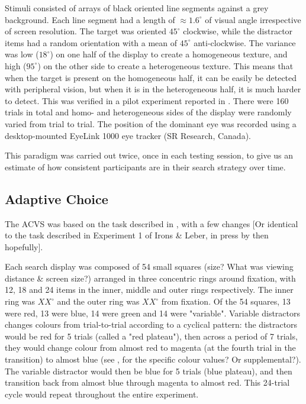 \documentclass[a4paper, oneside, 11pt, onecolumn]{article}
\begin{document}
Stimuli consisted of arrays of black oriented line segments against a grey background. Each line segment had a length of $\approx$$1.6^{\circ}$ of visual angle irrespective of screen resolution. The target was oriented $45^{\circ}$ clockwise, while the distractor items had a random orientation with a mean of $45^{\circ}$ anti-clockwise. The variance was low ($18^{\circ}$) on one half of the display to create a homogeneous texture, and high ($95^{\circ}$) on the other side to create a heterogeneous texture. This means that when the target is present on the homogeneous half, it can be easily be detected with peripheral vision, but when it is in the heterogeneous half, it is much harder to detect. This was verified in a pilot experiment reported in \cite{nowakowska2017}.  There were 160 trials in total and homo- and heterogeneous sides of the display were randomly varied from trial to trial. The position of the dominant eye was recorded using a desktop-mounted EyeLink 1000 eye tracker (SR Research, Canada). 

This paradigm was carried out twice, once in each testing session, to give us an estimate of how consistent participants are in their search strategy over time. 

\subsection{Adaptive Choice}

The ACVS was based on the task described in \cite{irons-leber2016}, with a few changes [Or identical to the task described in Experiment 1 of Irons \& Leber, in press by then hopefully].

Each search display was composed of 54 small squares (size? What was viewing distance \& screen size?) arranged in three concentric rings around fixation, with 12, 18 and 24 items in the inner, middle and outer rings respectively. The inner ring was $XX^{\circ}$ and the outer ring was $XX^{\circ}$ from fixation. Of the 54 squares, 13 were red, 13 were blue, 14 were green and 14 were "variable". Variable distractors changes colours from trial-to-trial according to a cyclical pattern: the distractors would be red for 5 trials (called a "red plateau"), then across a period of 7 trials, they would change colour from almost red to magenta (at the fourth trial in the transition) to almost blue (see \cite{irons-leber2017}, for the specific colour values? Or supplemental?). The variable distractor would then be blue for 5 trials (blue plateau), and then transition back from almost blue through magenta to almost red. This 24-trial cycle would repeat throughout the entire experiment. 
\end{document}
